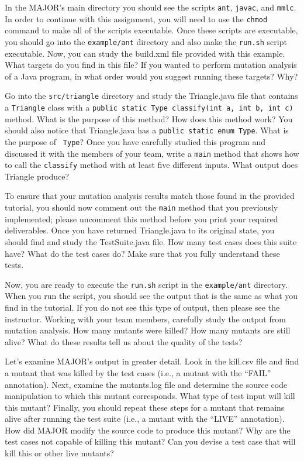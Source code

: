 In the MAJOR's main directory you should see the scripts {\tt ant}, {\tt javac}, and {\tt mmlc}.  In order to continue
with this assignment, you will need to use the {\tt chmod} command to make all of the scripts executable.  Once these
scripts are executable, you should go into the {\tt example/ant} directory and also make the {\tt run.sh} script
executable.  Now, you can study the build.xml file provided with this example. What targets do you find in this file? If
you wanted to perform mutation analysis of a Java program, in what order would you suggest running these targets? Why?

Go into the {\tt src/triangle} directory and study the Triangle.java file that contains a {\tt Triangle} class with a
{\tt public static Type classify(int a, int b, int c)} method.  What is the purpose of this method? How does this method
work?  You should also notice that Triangle.java has a {\tt public static enum Type}.  What is the purpose of {\tt
Type}? Once you have carefully studied this program and discussed it with the members of your team, write a {\tt main}
method that shows how to call the {\tt classify} method with at least five different inputs. What output does Triangle
produce? 

To ensure that your mutation analysis results match those found in the provided tutorial, you should now comment out the
{\tt main} method that you previously implemented; please uncomment this method before you print your required
deliverables. Once you have returned Triangle.java to its original state, you should find and study the TestSuite.java
file.  How many test cases does this suite have? What do the test cases do? Make sure that you fully understand these tests.

Now, you are ready to execute the {\tt run.sh} script in the {\tt example/ant} directory.  When you run the script, you
should see the output that is the same as what you find in the tutorial.  If you do not see this type of output, then
please see the instructor. Working with your team members, carefully study the output from mutation analysis.  How many
mutants were killed? How many mutants are still alive? What do these results tell us about the quality of the tests?

Let's examine MAJOR's output in greater detail. Look in the kill.csv file and find a mutant that was killed by the test
cases (i.e., a mutant with the ``FAIL'' annotation). Next, examine the mutants.log file and determine the source code
manipulation to which this mutant corresponds.  What type of test input will kill this mutant?  Finally, you should
repeat these steps for a mutant that remains alive after running the test suite (i.e., a mutant with the ``LIVE''
annotation). How did MAJOR modify the source code to produce this mutant? Why are the test cases not capable of killing
this mutant?  Can you devise a test case that will kill this or other live mutants?

